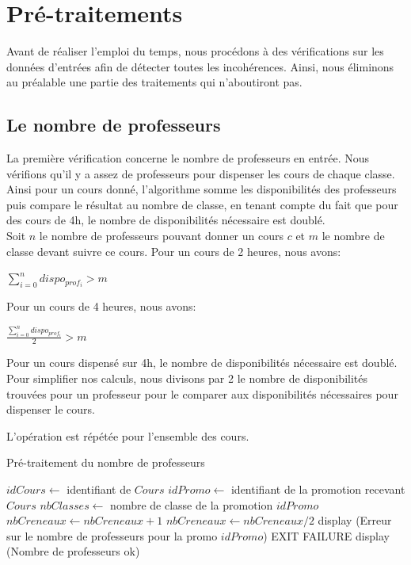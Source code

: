 
\section{Pré-traitements}
Avant de réaliser l'emploi du temps, nous procédons à des vérifications sur les données d'entrées afin de détecter toutes les incohérences. Ainsi, nous éliminons au préalable une partie des traitements qui n'aboutiront pas.

\subsection{Le nombre de professeurs}
La première vérification concerne le nombre de professeurs en entrée. Nous vérifions qu'il y a assez de professeurs pour dispenser les cours de chaque classe.
Ainsi pour un cours donné, l'algorithme somme les disponibilités des professeurs puis compare le résultat au nombre de classe, en tenant compte du fait que pour des cours de 4h, le nombre de disponibilités nécessaire est doublé.\\

Soit $n$ le nombre de professeurs pouvant donner un cours $c$ et $m$ le nombre de classe devant suivre ce cours.
Pour un cours de 2 heures, nous avons:
\begin{center}
$\sum_{i=0}^n dispo_{prof_i} > m$
\end{center}

Pour un cours de 4 heures, nous avons: 
\begin{center}
$\frac{\sum_{i=0}^n dispo_{prof_i}}{2} > m$
\end{center}

Pour un cours dispensé sur 4h, le nombre de disponibilités nécessaire est doublé. Pour simplifier nos calculs, nous divisons par 2 le nombre de disponibilités trouvées pour un professeur pour le comparer aux disponibilités nécessaires pour dispenser le cours.

L'opération est répétée pour l'ensemble des cours. 

\newpage

\begin{algorithm}
\caption{Pré-traitement du nombre de professeurs}
\begin{algorithmic}
\STATE $idCours \leftarrow$ identifiant de $Cours$
\STATE $idPromo \leftarrow$ identifiant de la promotion recevant $Cours$
\STATE $nbClasses \leftarrow$ nombre de classe de la promotion $idPromo$
\STATE $nbCreneaux \leftarrow nbCreneaux + 1$
\ENDIF
\ENDFOR
\ENDIF
\ENDFOR
{}
\STATE $nbCreneaux \leftarrow nbCreneaux / 2$
\ENDIF
{}
\STATE display (Erreur sur le nombre de professeurs pour la promo $idPromo$)
\STATE EXIT FAILURE
\ENDIF
\ENDFOR
\STATE display (Nombre de professeurs ok)
\end{algorithmic}
\end{algorithm}

